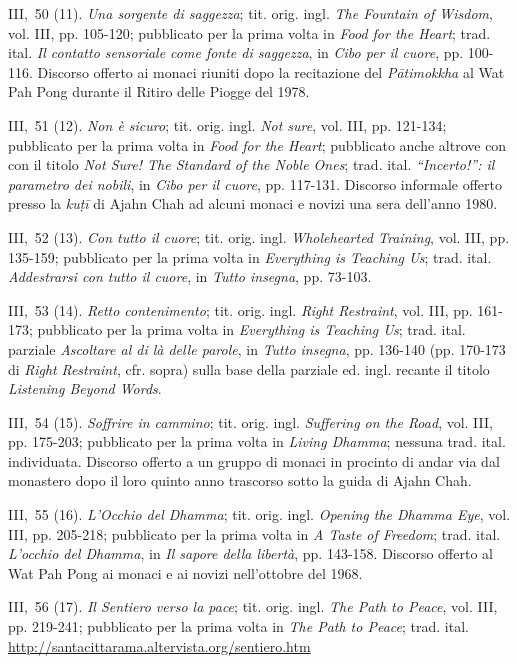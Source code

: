 III,~50 (11). \emph{Una sorgente di saggezza}; tit. orig. ingl.
\emph{The Fountain of Wisdom}, vol. III, pp. 105-120; pubblicato per la
prima volta in \emph{Food for the Heart}; trad. ital. \emph{Il contatto
sensoriale come fonte di saggezza}, in \emph{Cibo per il cuore}, pp.
100-116. Discorso offerto ai monaci riuniti dopo la recitazione del
\emph{Pātimokkha} al Wat Pah Pong durante il Ritiro delle Piogge del
1978.

III,~51 (12). \emph{Non è sicuro}; tit. orig. ingl. \emph{Not sure},
vol. III, pp. 121-134; pubblicato per la prima volta in \emph{Food for
the Heart}; pubblicato anche altrove con con il titolo \emph{Not Sure!
The Standard of the Noble Ones}; trad. ital. \emph{``Incerto!'': il
parametro dei nobili}, in \emph{Cibo per il cuore}, pp. 117-131.
Discorso informale offerto presso la \emph{kuṭī} di Ajahn Chah ad alcuni
monaci e novizi una sera dell'anno 1980.

III,~52 (13). \emph{Con tutto il cuore}; tit. orig. ingl.
\emph{Wholehearted Training}, vol. III, pp. 135-159; pubblicato per la
prima volta in \emph{Everything is Teaching Us}; trad. ital.
\emph{Addestrarsi con tutto il cuore}, in \emph{Tutto insegna}, pp.
73-103.

III,~53 (14). \emph{Retto contenimento}; tit. orig. ingl. \emph{Right
Restraint}, vol. III, pp. 161-173; pubblicato per la prima volta in
\emph{Everything is Teaching Us}; trad. ital. parziale \emph{Ascoltare
al di là delle parole}, in \emph{Tutto insegna}, pp. 136-140 (pp.
170-173 di \emph{Right} \emph{Restraint}, cfr. sopra) sulla base della
parziale ed. ingl. recante il titolo \emph{Listening Beyond Words}.

III,~54 (15). \emph{Soffrire in cammino}; tit. orig. ingl.
\emph{Suffering on the Road}, vol. III, pp. 175-203; pubblicato per la
prima volta in \emph{Living Dhamma}; nessuna trad. ital. individuata.
Discorso offerto a un gruppo di monaci in procinto di andar via dal
monastero dopo il loro quinto anno trascorso sotto la guida di Ajahn
Chah.

III,~55 (16). \emph{L'Occhio del Dhamma}; tit. orig. ingl. \emph{Opening
the Dhamma Eye}, vol. III, pp. 205-218; pubblicato per la prima volta in
\emph{A Taste of Freedom}; trad. ital. \emph{L'occhio del Dhamma}, in
\emph{Il sapore della libertà}, pp. 143-158. Discorso offerto al Wat Pah
Pong ai monaci e ai novizi nell'ottobre del 1968.

III,~56 (17). \emph{Il Sentiero verso la pace}; tit. orig. ingl.
\emph{The Path to Peace}, vol. III, pp. 219-241; pubblicato per la prima
volta in \emph{The Path to Peace}; trad. ital.
\url{http://santacittarama.altervista.org/sentiero.htm}


